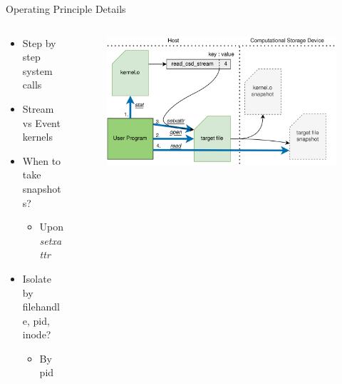 \documentclass[aspectratio=169]{beamer}
\begin{document}
\begin{frame}{Operating Principle Details}
    \begin{columns}
        \begin{column}{0.40\textwidth}
            \footnotesize
            \begin{itemize}
                \item Step by step system calls
                \item Stream vs Event kernels
                \item When to take snapshots?
                \begin{itemize}
                    \item Upon \textit{setxattr}
                \end{itemize}
                \item Isolate by filehandle, pid, inode?
                \begin{itemize}
                    \item By pid
                \end{itemize}
            \end{itemize}
            \textit{}
        \end{column}
        \begin{column}{0.60\textwidth}
            \begingroup
            \small
            \begin{figure}
                \centering
                \includegraphics[width=1\textwidth]{resources/images/offloading.png}
            \end{figure}
            \endgroup
        \end{column}
    \end{columns}
\end{frame}
\end{document}
